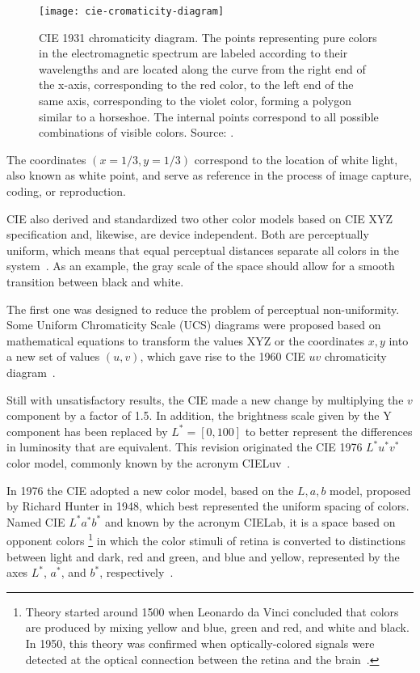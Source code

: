 \begin{figure}[!h]
  \centering
  \texttt{[image: cie-cromaticity-diagram]}
  \caption[CIE 1931 chromaticity diagram]{CIE 1931 chromaticity diagram. The points representing pure colors in the electromagnetic spectrum are labeled according to their wavelengths and are located along the curve from the right end of the x-axis, corresponding to the red color, to the left end of the same axis, corresponding to the violet color, forming a polygon similar to a horseshoe. The internal points correspond to all possible combinations of visible colors. Source: \citet{ben:09}.}
  \label{fig:cie-cromaticity-diagram} 
\end{figure}

The coordinates $ (x = 1/3, y = 1/3) $ correspond to the location of white light, also known as white point, and serve as reference in the process of image capture, coding, or reproduction.

CIE also derived and standardized two other color models based on CIE XYZ specification and, likewise, are device independent. Both are perceptually uniform, which means that equal perceptual distances separate all colors in the system~\citep{vezhnevets:03}. As an example, the gray scale of the space should allow for a smooth transition between black and white.

The first one was designed to reduce the problem of perceptual non-uniformity. Some Uniform Chromaticity Scale (UCS) diagrams were proposed based on mathematical equations to transform the values XYZ or the coordinates $x, y$ into a new set of values $(u, v)$, which gave rise to the 1960 CIE $uv$ chromaticity diagram~\citep{gevers:12}.

Still with unsatisfactory results, the CIE made a new change by multiplying the $v$ component by a factor of 1.5. In addition, the brightness scale given by the Y component has been replaced by $L^* = [0, 100]$ to better represent the differences in luminosity that are equivalent. This revision originated the CIE 1976 $L^*u^*v^*$ color model, commonly known by the acronym CIELuv~\citep{gevers:12}.

In 1976 the CIE adopted a new color model, based on the $L, a, b$ model, proposed by Richard Hunter in 1948, which best represented the uniform spacing of colors. Named CIE $L^*a^*b^*$ and known by the acronym CIELab, it is a space based on opponent colors \footnote{Theory started around 1500 when Leonardo da Vinci concluded that colors are produced by mixing yellow and blue, green and red, and white and black. In 1950, this theory was confirmed when optically-colored signals were detected at the optical connection between the retina and the brain~\citep{gevers:12}.} in which the color stimuli of retina is converted to distinctions between light and dark, red and green, and blue and yellow, represented by the axes $L^*$, $a^*$, and $b^*$, respectively~\citep{gevers:12}.


